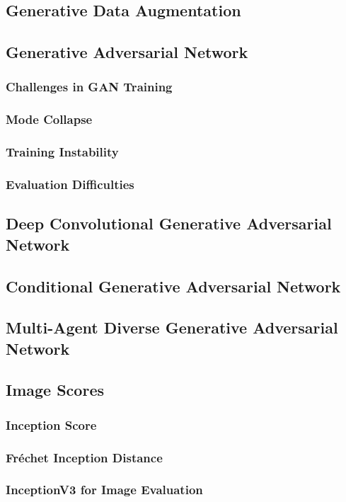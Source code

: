 \subsection[Generative Data Augmentation - GDA]{Generative Data Augmentation}\label{theoretical_gda}

\subsection[Generative Adversarial Network - GAN]{Generative Adversarial Network}\label{theoretical_gan}
\subsubsection{Challenges in GAN Training}
\subsubsection[Mode Collapse]{Mode Collapse}
\subsubsection[Training Instability]{Training Instability}
\subsubsection[Evaluation Difficulties]{Evaluation Difficulties}

\subsection[Deep Convolutional Generative Adversarial Network - DCGAN]{Deep Convolutional Generative Adversarial Network}\label{theoretical_dcgan}

\subsection[Conditional Generative Adversarial Network - cGAN]{Conditional Generative Adversarial Network}\label{theoretical_cgan}

\subsection[Multi-Agent Diverse Generative Adversarial Network - MADGAN]{Multi-Agent Diverse Generative Adversarial Network}\label{theoretical_madgan}

\subsection{Image Scores}\label{theoretical_image_scores}
\subsubsection[Inception Score - IS]{Inception Score}
\subsubsection[Fréchet Inception Distance - FID]{Fréchet Inception Distance}
\subsubsection[InceptionV3 Model]{InceptionV3 for Image Evaluation}










\newpage
